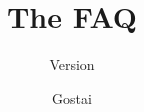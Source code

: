 \documentclass[openright,twoside,11pt]{book}
\title{The \urbi FAQ}
\subtitle{Version \VcsDescription}
\author{Gostai}
\begin{document}
\maketitle
\tableofcontents
\savesections
\raisesections
\let\chapter\section

\restoresections
\chapterIndex
\end{document}
